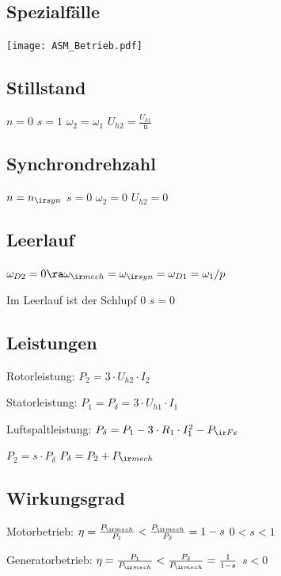 \documentclass[german]{latex4ei_fs}
\begin{document}
\begin{sectionbox}
\subsection{Spezialfälle}

\texttt{[image: ASM\_Betrieb.pdf]}

\subsection{Stillstand}

$n = 0$
\quad $s = 1$
\quad
$\omega_2 = \omega_1$
\quad
$U_{h2} = \frac{U_{h1}}{\text{ü}}$ 

\subsection{Synchrondrehzahl}


$n = n_{\ir syn}$
\quad $s = 0$
\quad
$\omega_2 = 0$
\quad
$U_{h2} = 0$ 

 \subsection{Leerlauf}
  $\omega_{D2} = 0 \ra \omega_{\ir mech} = \omega_{\ir syn} = \omega_{D1} = \omega_1 /p $ 

  Im Leerlauf ist der Schlupf 0 $s = 0$

\end{sectionbox}
\begin{sectionbox}
\subsection{Leistungen}

Rotorleistung: $P_2 = 3 \cdot U_{h2} \cdot I_2$

Statorleistung: $P_1 = P_\delta = 3 \cdot U_{h1} \cdot I_1$

Luftspaltleistung: $P_\delta = P_1 - 3 \cdot R_1 \cdot I_1^2 - P_{\ir Fe}$ 

$P_2 = s \cdot P_\delta$ \quad $P_\delta = P_2 + P_{\ir mech}$

\end{sectionbox}
\begin{sectionbox}
\subsection{Wirkungsgrad}
Motorbetrieb: $\eta = \frac{P_{\ir mech}}{P_1} < \frac{P_{\ir mech}}{P_\delta} = 1 - s$ \quad $0 < s < 1$

Generatorbetrieb: $\eta = \frac{P_1}{P_{\ir mech}} <\frac{P_\delta}{P_{\ir mech}} = \frac{1}{1 -s }$ \quad $s < 0$
\end{sectionbox}
\end{document}
